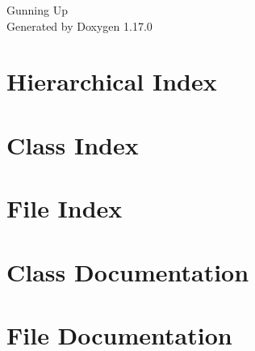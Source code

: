 \documentclass[twoside]{book}
\newcommand{\+}{\discretionary{\mbox{\scriptsize$\hookleftarrow$}}{}{}}
\newcommand{\clearemptydoublepage}{%
    \newpage{\pagestyle{empty}\cleardoublepage}%
  }
\begin{document}
  \raggedbottom
    \hypersetup{pageanchor=false,
                bookmarksnumbered=true,
                pdfencoding=unicode
               }
  \begin{titlepage}
  \vspace*{7cm}
  \begin{center}%
  {\Large Gunning Up}\\
  \vspace*{1cm}
  {\large Generated by Doxygen 1.17.0}\\
  \end{center}
  \end{titlepage}
  \clearemptydoublepage
  \tableofcontents
  \clearemptydoublepage
  \hypersetup{pageanchor=true}
\chapter{Hierarchical Index}

\chapter{Class Index}

\chapter{File Index}

\chapter{Class Documentation}















\chapter{File Documentation}









  \backmatter
  \newpage
  \clearemptydoublepage
  \printindex
\end{document}
